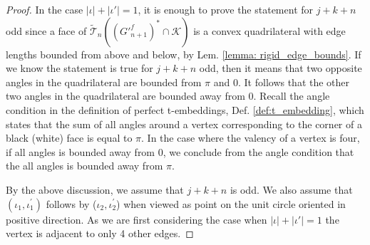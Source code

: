 \documentclass[12pt]{amsart}
\newcommand{\io}{{\iota}}
\numberwithin{equation}{section}
\theoremstyle{definition}
\begin{document}
\begin{proof}
In the case $|\io|+|\io'|=1$, it is enough to prove the statement for $j+k+n$ odd since a face of $\widetilde{\mathcal{T}}_n\left(\left(G'^f_{n+1}\right)^* \cap \mathcal{K}\right)$ is a convex quadrilateral with edge lengths bounded from above and below, by Lem. \ref{lemma: rigid_edge_bounds}.  If we know the statement is true for $j+k+n$ odd, then it means that two opposite angles in the quadrilateral are bounded from $\pi$ and 0. It follows that the other two angles in the quadrilateral are bounded away from 0. Recall the angle condition in the definition of perfect t-embeddings, Def. \ref{def:t_embedding}, which states that the sum of all angles around a vertex corresponding to the corner of a black (white) face is equal to $\pi$. In the case where the valency of a vertex is four, if all angles is bounded away from $0$, we conclude from the angle condition that the all angles is bounded away from $\pi$.

By the above discussion, we assume that $j+k+n$ is odd. We also assume that $(\iota_1, \iota_1^{\prime})$ follows by ($\iota_2, \iota_2^{\prime}$) when viewed as point on the unit circle oriented in positive direction. As we are first considering the case when $|\io|+|\io'|=1$ the vertex is adjacent to only 4 other edges.


\end{proof}
\end{document}
